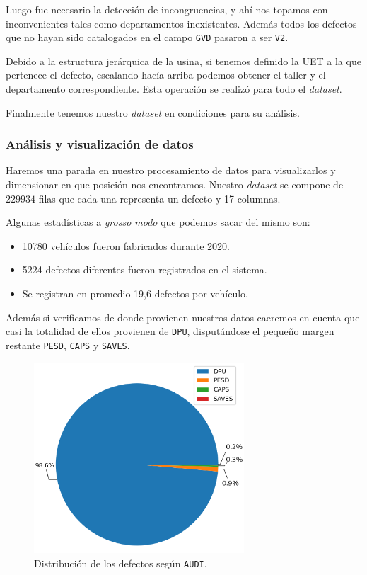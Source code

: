 \documentclass[a4paper,12pt]{article}
\begin{document}
Luego fue necesario la detección de incongruencias, y ahí nos topamos con inconvenientes tales como departamentos inexistentes. Además todos los defectos que no hayan sido catalogados en el campo \texttt{GVD} pasaron a ser \texttt{V2}.

Debido a la estructura jerárquica de la usina, si tenemos definido la UET a la que pertenece el defecto, escalando hacía arriba podemos obtener el taller y el departamento correspondiente. Esta operación se realizó para todo el \textit{dataset}.

Finalmente tenemos nuestro \textit{dataset} en condiciones para su análisis.

\subsubsection{Análisis y visualización de datos}

Haremos una parada en nuestro procesamiento de datos para visualizarlos y dimensionar en que posición nos encontramos.
Nuestro \textit{dataset} se compone de $229934$ filas que cada una representa un defecto y 17 columnas.

Algunas estadísticas a \textit{grosso modo} que podemos sacar del mismo son:

\begin{itemize}
	\item 10780 vehículos fueron fabricados durante 2020.
	\item 5224 defectos diferentes fueron registrados en el sistema.
	\item Se registran en promedio 19,6 defectos por vehículo.
\end{itemize}

Además si verificamos de donde provienen nuestros datos caeremos en cuenta que casi la totalidad de ellos provienen de \texttt{DPU}, disputándose el pequeño margen restante \texttt{PESD}, \texttt{CAPS} y \texttt{SAVES}.

\begin{figure}[H]
	\begin{center}				
	\includegraphics[width=0.7\textwidth]{audidist.png}
  	\caption{Distribución de los defectos según \texttt{AUDI}.}
  	\label{fig:distaudi}
  	\end{center}
\end{figure}
\end{document}
